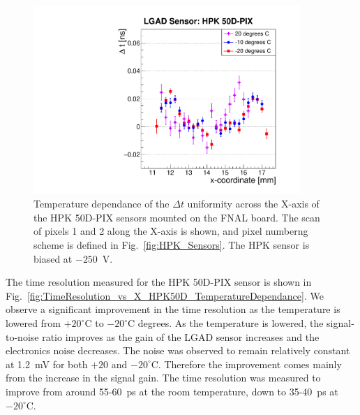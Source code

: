 \documentclass[preprint,1p]{elsarticle}
\begin{document}
\begin{figure}[htbp] 
\centering
\includegraphics[width=0.9\textwidth]{figs/FNAL_MeanTime_vs_X_HPK50D_TemperatureDependance.pdf} 
\caption{Temperature dependance of the $\Delta t$ uniformity across
the X-axis of the HPK 50D-PIX sensors mounted on the FNAL board. The scan of
pixels 1 and 2 along the X-axis is shown, and pixel numberng scheme is defined
in Fig.~\ref{fig:HPK_Sensors}. The HPK sensor is biased at $-250$~V.} 
\label{fig:MeanTime_vs_X_HPK50D_TemperatureDependance} 
\end{figure} 

The time resolution measured for the HPK 50D-PIX sensor is
shown in Fig.~\ref{fig:TimeResolution_vs_X_HPK50D_TemperatureDependance}. 
We observe a significant improvement in the time resolution as
the temperature is lowered from $+20^{\circ}$C to $-20^{\circ}$C degrees.
As the temperature is lowered, the signal-to-noise ratio improves as 
the gain of the LGAD sensor increases and the electronics noise decreases. 
The noise was observed to remain relatively constant at 1.2~mV for both $+20$ and
$-20^{\circ}$C. Therefore the improvement comes mainly from the increase in the 
signal gain. The time resolution was measured to
improve from around 55-60~ps at the room temperature, down to 35-40~ps at
$-20^{\circ}$C.
\end{document}
